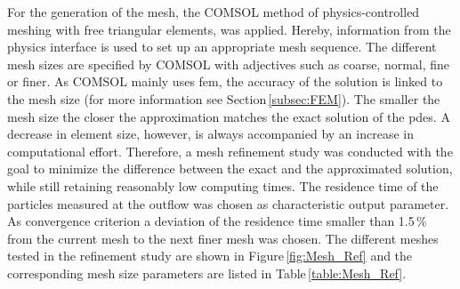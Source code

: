 For the generation of the mesh, the COMSOL method of physics-controlled meshing with free triangular elements, was applied. Hereby, information from the physics interface is used to set up an appropriate mesh sequence. The different mesh sizes are specified by COMSOL with adjectives such as coarse, normal, fine or finer. As COMSOL mainly uses \gls{fem}, the accuracy of the solution is linked to the mesh size (for more information see Section\,\ref{subsec:FEM}). The smaller the mesh size the closer the approximation matches the exact solution of the \glspl{pde}. A decrease in element size, however, is always accompanied by an increase in computational effort. Therefore, a mesh refinement study was conducted with the goal to minimize the difference between the exact and the approximated solution, while still retaining reasonably low computing times. The residence time of the particles measured at the outflow was chosen as characteristic output parameter. As convergence criterion a deviation of the residence time smaller than 1.5\,\% from the current mesh to the next finer mesh was chosen. The different meshes tested in the refinement study are shown in Figure\,\ref{fig:Mesh_Ref} and the corresponding mesh size parameters are listed in Table\,\ref{table:Mesh_Ref}.  

